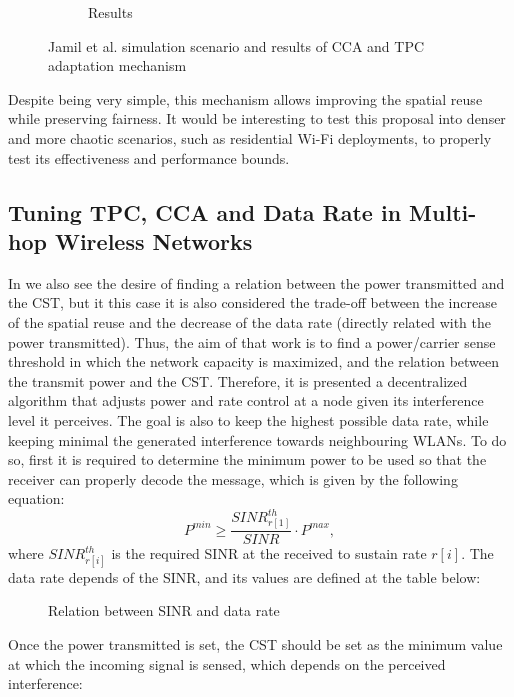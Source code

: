 \documentclass[12pt, a4paper,twoside]{tesi_upf}
\begin{document}
\begin{figure}[t!]
\begin{subfigure}[b]{0.3\textwidth}
					\caption{Results}
					\label{fig:jamil_et_al_results}
				\end{subfigure}		
				\caption{Jamil et al. simulation scenario and results of CCA and TPC adaptation mechanism}
				\label{fig:jamil_et_al_scenario_and_results}
			\end{figure}	
			
			Despite being very simple, this mechanism allows improving the spatial reuse while preserving fairness. It would be interesting to test this proposal into denser and more chaotic scenarios, such as residential Wi-Fi deployments, to properly test its effectiveness and performance bounds.		
	
			\subsection{Tuning TPC, CCA and Data Rate in Multi-hop Wireless Networks}
			In \cite{kim2006improving} we also see the desire of finding a relation between the power transmitted and the CST, but it this case it is also considered the trade-off between the increase of the spatial reuse and the decrease of the data rate (directly related with the power transmitted). Thus, the aim of that work is to find a power/carrier sense threshold in which the network capacity is maximized, and the relation between the transmit power and the CST. Therefore, it is presented a decentralized algorithm that adjusts power and rate control at a node given its interference level it perceives. The goal is also to keep the highest possible data rate, while keeping minimal the generated interference towards neighbouring WLANs. To do so, first it is required to determine the minimum power to be used so that the receiver can properly decode the message, which is given by the following equation:
			\begin{equation}
			P^{min} \geq \frac{SINR_{r[1]}^{th}}{SINR} \cdot P^{max},
			\end{equation}
			where $SINR_{r[i]}^{th}$ is the required SINR at the received to sustain rate $r[i]$. The data rate depends of the SINR, and its values are defined at the table below:	
			\begin{figure}[h!]
				\centering
				\caption{Relation between SINR and data rate}
				\label{fig:data_rate_table}
			\end{figure}	
			Once the power transmitted is set, the CST should be set as the minimum value at which the incoming signal is sensed, which depends on the perceived interference:
\end{document}
